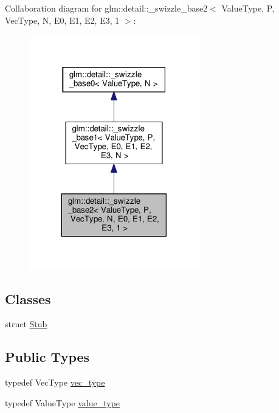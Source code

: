 Collaboration diagram for glm\+:\+:detail\+:\+:\+\_\+swizzle\+\_\+base2$<$ Value\+Type, P, Vec\+Type, N, E0, E1, E2, E3, 1 $>$\+:\nopagebreak
\begin{figure}[H]
\begin{center}
\leavevmode
\includegraphics[width=209pt]{structglm_1_1detail_1_1__swizzle__base2_3_01_value_type_00_01_p_00_01_vec_type_00_01_n_00_01_e0_3f0926ba95fd097e168bf48489af427a}
\end{center}
\end{figure}
\subsection*{Classes}
\begin{DoxyCompactItemize}
\item 
struct \hyperlink{structglm_1_1detail_1_1__swizzle__base2_3_01_value_type_00_01_p_00_01_vec_type_00_01_n_00_01_e0_17279995be88bc842083eed40758473c}{Stub}
\end{DoxyCompactItemize}
\subsection*{Public Types}
\begin{DoxyCompactItemize}
\item 
typedef Vec\+Type \hyperlink{structglm_1_1detail_1_1__swizzle__base2_3_01_value_type_00_01_p_00_01_vec_type_00_01_n_00_01_e0_fc19218d69dc8988a4a57fbe7f79725c_aa478e9f198b8832d76245adde9c627ec}{vec\+\_\+type}
\item 
typedef Value\+Type \hyperlink{structglm_1_1detail_1_1__swizzle__base2_3_01_value_type_00_01_p_00_01_vec_type_00_01_n_00_01_e0_fc19218d69dc8988a4a57fbe7f79725c_aea7ec681454787ad7a322c06aec98757}{value\+\_\+type}
\end{DoxyCompactItemize}
